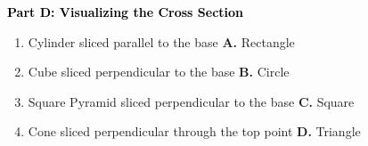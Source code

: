 \documentclass[12pt, letterpaper, fleqn]{article}
\begin{document}
\newpage

\begin{tcolorbox}[colback=customteal!20]
\large\textcolor{black}{\textbf{Part D: Visualizing the Cross Section}}
\end{tcolorbox}

\vspace{3mm}

\begin{enumerate}[itemsep=2.5cm, leftmargin=0.6cm, resume]
\item Cylinder sliced parallel to the base \hfill \textbf{A.} Rectangle
\item Cube sliced perpendicular to the base \hfill \textbf{B.} Circle
\item Square Pyramid sliced perpendicular to the base \hfill \textbf{C.} Square
\item Cone sliced perpendicular through the top point \hfill \textbf{D.} Triangle
\end{enumerate}
\end{document}
